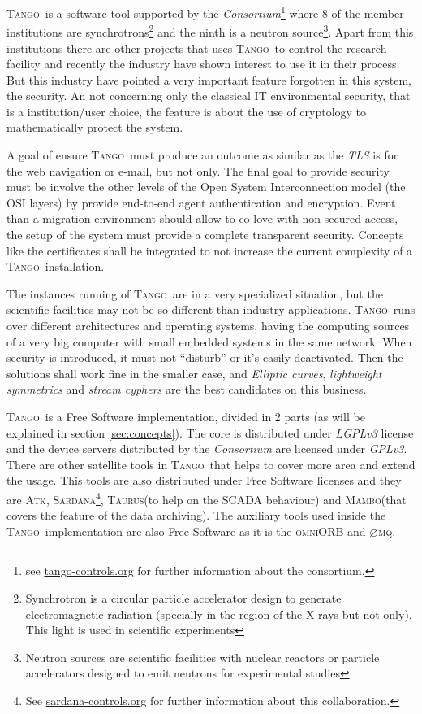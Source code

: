\documentclass[10pt,a4paper,twoside]{llncs}
\newcommand{\tango}{\textsc{Tango}}
\newcommand{\atk}{\textsc{Atk}}
\newcommand{\sardana}{\textsc{Sardana}}
\newcommand{\taurus}{\textsc{Taurus}}
\newcommand{\mambo}{\textsc{Mambo}}
\newcommand{\omniorb}{\textsc{omniORB}}
\newcommand{\zmq}{\textsc{$\varnothing$mq}}
\begin{document}
\tango\, is a software tool supported by the \emph{Consortium}\footnote{see \href{https://www.tango-controls.org/}{tango-controls.org} for further information about the consortium.} where 8 of the member institutions are synchrotrons\footnote{Synchrotron is a circular particle accelerator design to generate electromagnetic radiation (specially in the region of the X-rays but not only). This light is used in scientific experiments} and the ninth is a neutron source\footnote{Neutron sources are scientific facilities with nuclear reactors or particle accelerators designed to emit neutrons for experimental studies}. Apart from this institutions there are other projects that uses \tango\, to control the research facility and recently the industry have shown interest to use it in their process. But this industry have pointed a very important feature forgotten in this system, the security. An not concerning only the classical IT environmental security, that is a institution/user choice, the feature is about the use 
of cryptology to mathematically protect the 
system.

A goal of ensure \tango\, must produce an outcome as similar as the \emph{TLS} is for the web navigation or e-mail, but not only. The final goal to provide security must be involve the other levels of the Open System Interconnection model (the OSI layers) by provide end-to-end agent authentication and encryption. Event than a migration environment should allow to co-love with non secured access, the setup of the system must provide a complete transparent security. Concepts like the certificates shall be integrated to not increase the current complexity of a \tango\, installation.

The instances running of \tango\, are in a very specialized situation, but the scientific facilities may not be so different than industry applications. \tango\, runs over different architectures and operating systems, having the computing sources of a very big computer with small embedded systems in the same network. When security is introduced, it must not ``disturb'' or it's easily deactivated. Then the solutions shall work fine in the smaller case, and \emph{Elliptic curves}, \emph{lightweight symmetrics} and \emph{stream cyphers} are the best candidates on this business.

\tango\, is a Free Software implementation, divided in 2 parts (as will be explained in section \ref{sec:concepts}). The core is distributed under \emph{LGPLv3} license and the device servers distributed by the \emph{Consortium} are licensed under \emph{GPLv3}. There are other satellite tools in \tango\, that helps to cover more area and extend the usage. This tools are also distributed under Free Software licenses and they are \atk, \sardana\footnote{See \href{https://www.sardana-controls.org/}{sardana-controls.org} for further information about this collaboration.}, \taurus (to help on the SCADA behaviour) and \mambo (that covers the feature of the data archiving). The auxiliary tools used inside the \tango\, implementation are also Free Software as it is the \omniorb \cite{omniORB41} and \zmq \cite{zmq32}.
\end{document}
